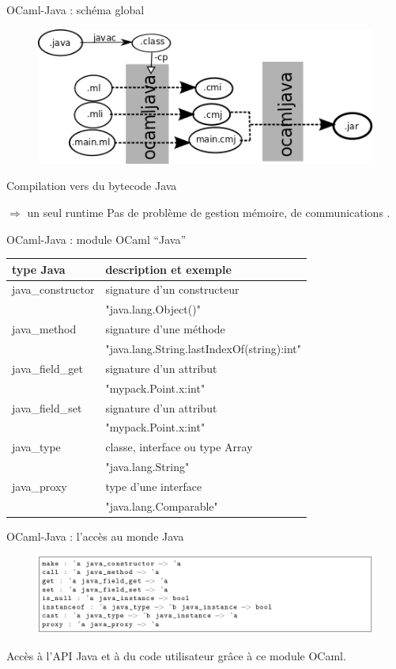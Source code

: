\documentclass{beamer}
\begin{document}
\begin{frame}{OCaml-Java : schéma global}
\begin{figure}
  \centering
  \includegraphics[scale=0.5]{schemaOCamlJava.png}
\end{figure}
Compilation vers du bytecode Java

$\Rightarrow$ un seul runtime
Pas de problème de gestion mémoire, de communications .
\end{frame}

\begin{frame}{OCaml-Java : module OCaml ``Java''}
\begin{tabular}{|l|l|}
  \hline
  type Java & description et exemple \\
  \hline
  java\_constructor & signature d'un constructeur  \\
  &  "java.lang.Object()" \\
  \hline
  java\_method & signature d'une méthode \\
  & "java.lang.String.lastIndexOf(string):int"\\
  \hline
  java\_field\_get & signature d'un attribut\\
  & "mypack.Point.x:int" \\
  \hline
  java\_field\_set & signature d'un attribut\\
  & "mypack.Point.x:int" \\
  \hline
  java\_type & classe, interface ou type Array\\
  & "java.lang.String"\\
  \hline
  java\_proxy & type d'une interface\\
  & "java.lang.Comparable"\\ 
  \hline
\end{tabular}
\end{frame}



\begin{frame}{OCaml-Java : l'accès au monde Java}

\begin{figure}[h]
  \centering
  \includegraphics[scale=0.35]{methModuleJava.png}
\end{figure}

Accès à l'API Java et à du code utilisateur grâce à ce module OCaml.




\end{frame}
\end{document}
